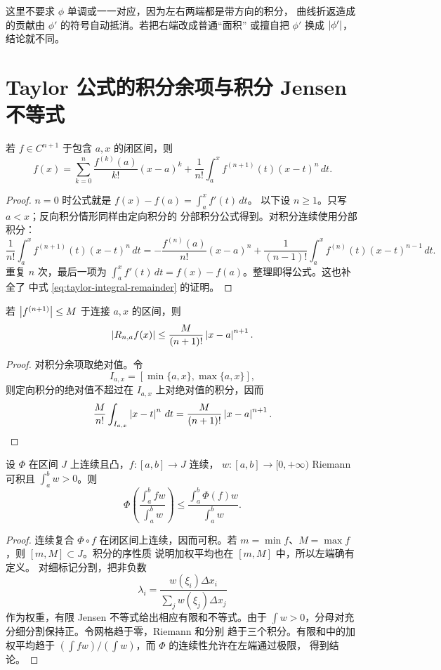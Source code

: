 这里不要求 \(\phi\) 单调或一一对应，因为左右两端都是带方向的积分，
曲线折返造成的贡献由 \(\phi'\) 的符号自动抵消。若把右端改成普通“面积”
或擅自把 \(\phi'\) 换成 \(\left|\phi'\right|\)，结论就不同。

\section{Taylor 公式的积分余项与积分 Jensen 不等式}

\begin{theorem}
\label{thm:taylor-integral-remainder}
若 \(f\in C^{n+1}\) 于包含 \(a,x\) 的闭区间，则
\[
 f(x)=\sum_{k=0}^n\frac{f^{(k)}(a)}{k!}(x-a)^k
 +\frac1{n!}\int_a^x f^{(n+1)}(t)(x-t)^n\,dt.
\]
\end{theorem}

\begin{proof}
\(n=0\) 时公式就是 \(f(x)-f(a)=\int_a^x f'(t)\,dt\)。
以下设 \(n\ge1\)。只写 \(a<x\)；反向积分情形同样由定向积分的
分部积分公式得到。对积分连续使用分部积分：
\[
 \frac1{n!}\int_a^x f^{(n+1)}(t)(x-t)^n\,dt
 =-\frac{f^{(n)}(a)}{n!}(x-a)^n
  +\frac1{(n-1)!}\int_a^x f^{(n)}(t)(x-t)^{n-1}\,dt.
\]
重复 \(n\) 次，最后一项为
\(\int_a^x f'(t)\,dt=f(x)-f(a)\)。整理即得公式。这也补全了
 中式
\eqref{eq:taylor-integral-remainder} 的证明。
\end{proof}

\begin{corollary}
若 \(\left|f^{(n+1)}\right|\le M\) 于连接 \(a,x\) 的区间，则
\[
 \left|R_{n,a}f(x)\right|
 \le \frac{M}{(n+1)!}\left|x-a\right|^{n+1}.
\]
\end{corollary}

\begin{proof}
对积分余项取绝对值。令
\[
 I_{a,x}=[\min\{a,x\},\max\{a,x\}],
\]
则定向积分的绝对值不超过在 \(I_{a,x}\) 上对绝对值的积分，因而
\[
 \frac{M}{n!}\int_{I_{a,x}}\left|x-t\right|^n\,dt
 =\frac{M}{(n+1)!}\left|x-a\right|^{n+1}.
\]
\end{proof}

\begin{theorem}
\label{thm:integral-jensen-riemann}
设 \(\Phi\) 在区间 \(J\) 上连续且凸，\(f:[a,b]\to J\) 连续，
\(w:[a,b]\to[0,+\infty)\) Riemann 可积且
\(\int_a^b w>0\)。则
\[
 \Phi\!\left(
 \frac{\int_a^b fw}{\int_a^b w}
 \right)
 \le
 \frac{\int_a^b \Phi(f)w}{\int_a^b w}.
\]
\end{theorem}

\begin{proof}
连续复合 \(\Phi\circ f\) 在闭区间上连续，因而可积。若
\(m=\min f\)、\(M=\max f\)，则 \([m,M]\subset J\)。积分的序性质
说明加权平均也在 \([m,M]\) 中，所以左端确有定义。
对细标记分割，把非负数
\[
 \lambda_i=
 \frac{w(\xi_i)\Delta x_i}
      {\sum_j w(\xi_j)\Delta x_j}
\]
作为权重，有限 Jensen 不等式给出相应有限和不等式。由于
\(\int w>0\)，分母对充分细分割保持正。令网格趋于零，Riemann 和分别
趋于三个积分。有限和中的加权平均趋于
\((\int fw)/(\int w)\)，而 \(\Phi\) 的连续性允许在左端通过极限，
得到结论。
\end{proof}

